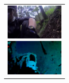 \documentclass[MIRU,submit]{miru2019j}
\begin{document}
\begin{figure}[tb]
    \begin{tabular}{l}

      \begin{minipage}{0.32\hsize}
        \begin{center}
          \includegraphics[clip, width=2.8cm]{./Figures/still_seevictim3.eps}
        \end{center}
      \end{minipage}

      \begin{minipage}{0.32\hsize}
        \begin{center}
          \includegraphics[clip, width=2.8cm]{./Figures/optic_seevictim3.eps}
        \end{center}
      \end{minipage}


\end{tabular}
\end{figure}
\end{document}
